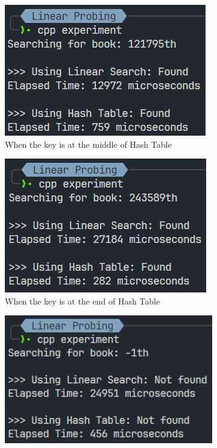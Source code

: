 \begin{itemize}
\begin{figure}[!ht]
\begin{subfigure}{0.45\textwidth}
			      \includegraphics[width=\textwidth]{imgs/Linear Probing/mid.png}
			      \caption{When the key is at the middle of Hash Table}\label{fig:linearprobing-mid-metric}
		      \end{subfigure}
		      \hfill
		      \begin{subfigure}{0.45\textwidth}
			      \centering
			      \includegraphics[width=\textwidth]{imgs/Linear Probing/end.png}
			      \caption{When the key is at the end of Hash Table}\label{fig:linearprobing-end-metric}
		      \end{subfigure}
		      \hfill
		      \begin{subfigure}{0.45\textwidth}
			      \centering
			      \includegraphics[width=\textwidth]{imgs/Linear Probing/not-found.png}

\end{subfigure}
\end{figure}
\end{itemize}
